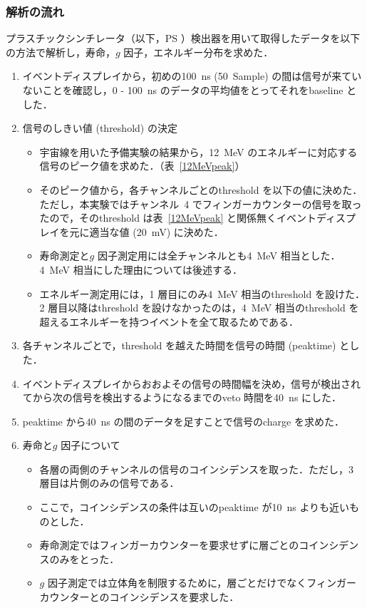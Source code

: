 \subsubsection{解析の流れ}
プラスチックシンチレータ（以下，PS ）検出器を用いて取得したデータを以下の方法で解析し，寿命，$g$ 因子，エネルギー分布を求めた．
\begin{enumerate}
\item イベントディスプレイから，初めの100~ns (50~Sample) の間は信号が来ていないことを確認し，0 - 100~ns のデータの平均値をとってそれをbaseline とした．
\item 信号のしきい値 (threshold) の決定
\begin{itemize}
\item 宇宙線を用いた予備実験の結果から，12~MeV のエネルギーに対応する信号のピーク値を求めた．（表~\ref{12MeVpeak}）%
\item そのピーク値から，各チャンネルごとのthreshold を以下の値に決めた．ただし，本実験ではチャンネル~4 でフィンガーカウンターの信号を取ったので，そのthreshold は表~\ref{12MeVpeak} と関係無くイベントディスプレイを元に適当な値 (20~mV) に決めた．
\item 寿命測定と$g$ 因子測定用には全チャンネルとも4~MeV 相当とした．4~MeV 相当にした理由については後述する．
\item エネルギー測定用には，1 層目にのみ4~MeV 相当のthreshold を設けた．2 層目以降はthreshold を設けなかったのは，4~MeV 相当のthreshold を超えるエネルギーを持つイベントを全て取るためである．
\end{itemize}
\item 各チャンネルごとで，threshold を越えた時間を信号の時間 (peaktime) とした．
\item イベントディスプレイからおおよその信号の時間幅を決め，信号が検出されてから次の信号を検出するようになるまでのveto 時間を40~ns にした．
\item peaktime から40~ns の間のデータを足すことで信号のcharge を求めた．
\item 寿命と$g$ 因子について
\begin{itemize}
\item 各層の両側のチャンネルの信号のコインシデンスを取った．ただし，3 層目は片側のみの信号である．
\item ここで，コインシデンスの条件は互いのpeaktime が10~ns よりも近いものとした．
\item 寿命測定ではフィンガーカウンターを要求せずに層ごとのコインシデンスのみをとった．
\item $g$ 因子測定では立体角を制限するために，層ごとだけでなくフィンガーカウンターとのコインシデンスを要求した．

\end{itemize}
\end{enumerate}
